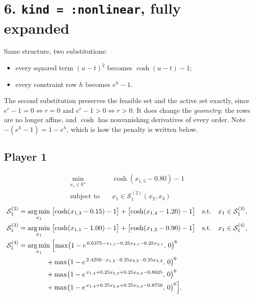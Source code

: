 \documentclass[11pt]{article}
\newcommand{\argmin}{\operatorname*{arg\,min}}
\begin{document}
\section*{6. \texttt{kind = :nonlinear}, fully expanded}

Same structure, two substitutions:
\begin{itemize}
  \item every squared term \((u-t)^2\) becomes \(\cosh(u-t)-1\);
  \item every constraint row \(h\) becomes \(e^{h}-1\).
\end{itemize}
The second substitution preserves the feasible set and the active set exactly, since
\(e^{r}-1 = 0 \iff r = 0\) and \(e^{r}-1 > 0 \iff r > 0\). It does change the \emph{geometry}:
the rows are no longer affine, and \(\cosh\) has nonvanishing derivatives of every order. Note
\(-(e^{h}-1) = 1-e^{h}\), which is how the penalty is written below.

\subsection*{Player 1}
\[
\begin{aligned}
  \min_{x_1 \in \mathbb{R}^5} \quad & \cosh(x_{1,5}-0.80)-1 \\
  \text{subject to} \quad & x_1 \in \mathcal{S}_1^{(2)}(x_2,x_3)
\end{aligned}
\]
\[
\begin{aligned}
  \mathcal{S}_1^{(2)} &= \argmin_{x_1} \;
    \bigl[\cosh(x_{1,3}-0.15)-1\bigr] + \bigl[\cosh(x_{1,4}-1.20)-1\bigr]
    \quad \text{s.t.} \quad x_1 \in \mathcal{S}_1^{(3)}, \\
  \mathcal{S}_1^{(3)} &= \argmin_{x_1} \;
    \bigl[\cosh(x_{1,1}-1.00)-1\bigr] + \bigl[\cosh(x_{1,2}-0.90)-1\bigr]
    \quad \text{s.t.} \quad x_1 \in \mathcal{S}_1^{(4)}, \\
  \mathcal{S}_1^{(4)} &= \argmin_{x_1} \;
    \Bigl[ \max\bigl(1 - e^{\,0.6375 - x_{1,1} - 0.25x_{2,1} - 0.25x_{3,1}},\,0\bigr)^6 \\
    &\qquad\qquad + \max\bigl(1 - e^{\,2.4250 - x_{1,2} - 0.25x_{2,2} - 0.25x_{3,2}},\,0\bigr)^6 \\
    &\qquad\qquad + \max\bigl(1 - e^{\,x_{1,3} + 0.25x_{2,3} + 0.25x_{3,3} - 0.8625},\,0\bigr)^6 \\
    &\qquad\qquad + \max\bigl(1 - e^{\,x_{1,4} + 0.25x_{2,4} + 0.25x_{3,4} - 0.8750},\,0\bigr)^6 \Bigr].
\end{aligned}
\]
\end{document}
